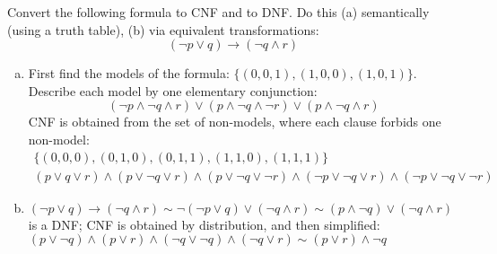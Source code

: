 \begin{problem} 
    
    Convert the following formula to CNF and to DNF. Do this (a) semantically (using a truth table), (b) via equivalent transformations:
    $$
    (\neg p \vee q)\to (\neg q \wedge r)
    $$

    \begin{solution}
        \begin{enumerate}[(a)]
            \item First find the models of the formula: $\{(0,0,1),(1,0,0),(1,0,1)\}$. Describe each model by one elementary conjunction:
            $$
            (\neg p\land \neg q\land r)\lor
            (p\land \neg q\land \neg r)\lor
            (p\land \neg q\land r)
            $$
            CNF is obtained from the set of non-models, where each clause forbids one non-model:
            \begin{gather*}
                \{(0,0,0),(0,1,0),(0,1,1),(1,1,0),(1,1,1)\}\\
                (p\lor q\lor r)\land
                (p\lor \neg q\lor r)\land
                (p\lor \neg q\lor \neg r)\land
                (\neg p\lor \neg q\lor r)\land
                (\neg p\lor \neg q\lor \neg r)
            \end{gather*} 
            
            \item $(\neg p \vee q)\to (\neg q \wedge r)\sim \neg (\neg p \vee q)\lor (\neg q \wedge r)
            \sim (p \wedge \neg q)\lor (\neg q \wedge r)
            $ is a DNF; CNF is obtained by distribution, and then simplified: $(p\lor \neg q)\land (p\lor r)\land (\neg q\lor\neg q)\land (\neg q\lor r)\sim (p\lor r)\land \neg q$
        \end{enumerate}
            
    \end{solution}
        
\end{problem}


